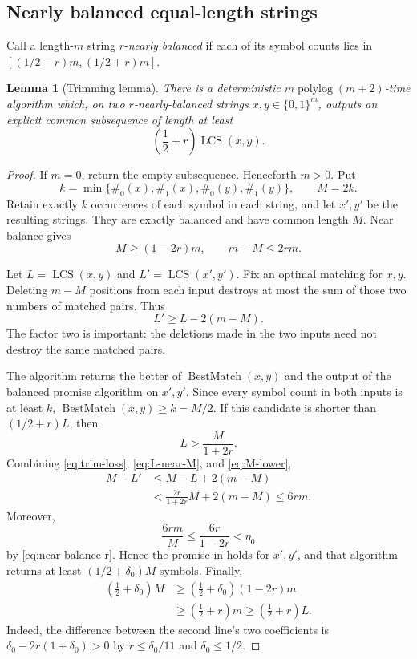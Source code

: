 \documentclass[11pt]{article}
\newtheorem{lemma}[lemma]{Lemma}
\theoremstyle{remark}
\newcommand{\LCS}{\operatorname{LCS}}
\newcommand{\polylog}{\operatorname{polylog}}
\newcommand{\BestMatch}{\operatorname{BestMatch}}
\begin{document}
\subsection{Nearly balanced equal-length strings}

Call a length-$m$ string $r$-\emph{nearly balanced} if each of its
symbol counts lies in
$[(1/2-r)m,(1/2+r)m]$.

\begin{lemma}[Trimming lemma]\label{lem:nearly-balanced}
There is a deterministic $m\polylog(m+2)$-time algorithm which, on
two $r$-nearly-balanced strings $x,y\in\{0,1\}^m$, outputs an explicit
common subsequence of length at least
\[
 \left(\frac12+r\right)\LCS(x,y).
\]
\end{lemma}

\begin{proof}
If $m=0$, return the empty subsequence.  Henceforth $m>0$.
Put
\[
 k=\min\{\#_0(x),\#_1(x),\#_0(y),\#_1(y)\},
 \qquad M=2k.
\]
Retain exactly $k$ occurrences of each symbol in each string, and let
$x',y'$ be the resulting strings.  They are exactly balanced and have
common length $M$.  Near balance gives
\begin{equation}\label{eq:M-lower}
 M\ge(1-2r)m,
 \qquad m-M\le2rm.
\end{equation}

Let $L=\LCS(x,y)$ and $L'=\LCS(x',y')$.  Fix an optimal matching for
$x,y$.  Deleting $m-M$ positions from each input destroys at most the
sum of those two numbers of matched pairs.  Thus
\begin{equation}\label{eq:trim-loss}
 L'\ge L-2(m-M).
\end{equation}
The factor two is important: the deletions made in the two inputs need
not destroy the same matched pairs.

The algorithm returns the better of $\BestMatch(x,y)$ and the output
of the balanced promise algorithm on $x',y'$.  Since every symbol
count in both inputs is at least $k$,
$\BestMatch(x,y)\ge k=M/2$.  If this candidate is shorter than
$(1/2+r)L$, then
\begin{equation}\label{eq:L-near-M}
 L>\frac{M}{1+2r}.
\end{equation}
Combining \eqref{eq:trim-loss}, \eqref{eq:L-near-M}, and
\eqref{eq:M-lower},
\begin{align}
 M-L'
 &\le M-L+2(m-M)\nonumber\\
 &<\frac{2r}{1+2r}M+2(m-M)
 \le6rm.\label{eq:trim-defect}
\end{align}
Moreover,
\[
 \frac{6rm}{M}\le\frac{6r}{1-2r}<\eta_0
\]
by \eqref{eq:near-balance-r}.  Hence the promise in
 holds for $x',y'$, and that algorithm returns at
least $(1/2+\delta_0)M$ symbols.  Finally,
\begin{align*}
 \left(\frac12+\delta_0\right)M
 &\ge\left(\frac12+\delta_0\right)(1-2r)m\\
 &\ge\left(\frac12+r\right)m
 \ge\left(\frac12+r\right)L.
\end{align*}
Indeed, the difference between the second line's two coefficients is
$\delta_0-2r(1+\delta_0)>0$ by
$r\le\delta_0/11$ and $\delta_0\le1/2$.


\end{proof}
\end{document}
